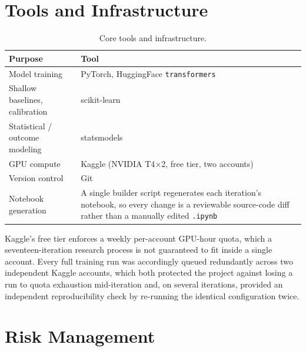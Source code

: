 \section{Tools and Infrastructure}

\begin{table}[H]
\centering
\caption{Core tools and infrastructure.}
\label{tab:tools}
\begin{tabular}{@{}p{3.6cm}p{9.2cm}@{}}
\toprule
\textbf{Purpose} & \textbf{Tool} \\
\midrule
Model training & PyTorch, HuggingFace \texttt{transformers} \\
Shallow baselines, calibration & scikit-learn \\
Statistical / outcome modeling & statsmodels \\
GPU compute & Kaggle (NVIDIA T4$\times$2, free tier, two accounts) \\
Version control & Git \\
Notebook generation & A single builder script regenerates each iteration's notebook, so every change is a reviewable source-code diff rather than a manually edited \texttt{.ipynb} \\
\bottomrule
\end{tabular}
\end{table}

Kaggle's free tier enforces a weekly per-account GPU-hour quota, which a
seventeen-iteration research process is not guaranteed to fit inside a single
account. Every full training run was accordingly queued redundantly across
two independent Kaggle accounts, which both protected the project against
losing a run to quota exhaustion mid-iteration and, on several iterations,
provided an independent reproducibility check by re-running the identical
configuration twice.

\section{Risk Management}

